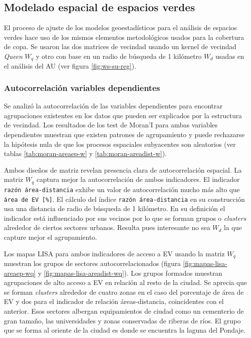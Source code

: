 \documentclass[12pt,a4paper,openany]{book}
\theoremstyle{definition}
\theoremstyle{definition}
\theoremstyle{definition}
\theoremstyle{remark}
\begin{document}
\subsection{Modelado espacial de espacios
verdes}\label{modelado-espacial-de-espacios-verdes}

El proceso de ajuste de los modelos geoestadísticos para el análisis de
espacios verdes hace uso de los mismos elementos metodológicos usados
para la cobertura de copa. Se usaron las dos matrices de vecindad usando
un kernel de vecindad \emph{Queen} \(W_q\) y otro con base en un radio
de búsqueda de 1 kilómetro \(W_d\) usadas en el análisis del AU (ver
figura \ref{fig:ws-su-reg}).

\subsubsection{Autocorrelación variables
dependientes}\label{autocorrelaciuxf3n-variables-dependientes-1}

Se analizó la autocorrelación de las variables dependientes para
encontrar agrupaciones existentes en los datos que pueden ser explicados
por la estructura de vecindad. Los resultados de los test de Moran'I
para ambas variables dependientes muestran que existen patrones de
agrupamiento y puede rechazarse la hipótesis nula de que los procesos
espaciales subyacentes son aleatorios (ver tablas
\ref{tab:moran-areaep-w} y \ref{tab:moran-areadist-w}).

Ambos diseños de matriz revelan presencia clara de autocorrelación
espacial. La matriz \(W_q\) captura mejor la autocorrelación de ambos
indicadores. El indicador \texttt{razón\ área-distancia} exhibe un valor
de autocorrelación mucho más alto que \texttt{área\ de\ EV\ {[}\%{]}}.
El cálculo del índice \texttt{razón\ área-distancia} en su construcción
usa una distancia de radio de búsqueda de 1 kilómetro. En su definición
el indicador está influenciado por sus vecinos por lo que se forman
grupos o \emph{clusters} alrededor de ciertos sectores urbanos. Resulta
pues interesante no sea \(W_d\) la que capture mejor el agrupamiento.

Los mapas LISA para ambos indicadores de acceso a EV usando la matriz
\(W_q\) muestran los grupos de sectores autocorrelacionados (figura
\ref{fig:mapas-lisa-areaep-wq} y \ref{fig:mapas-lisa-areadist-wq}). Los
grupos formados muestran agrupaciones de alto acceso a EV en relación al
resto de la ciudad. Se aprecia que se forman \emph{clusters} alrededor
de cuatro zonas en el caso del porcentaje de área de EV y dos para el
indicador de relación áreas-distancia, coincidentes con el anterior.
Esos sectores albergan equipamientos de ciudad como un cementerio de
gran tamaño, las universidades y zonas conservadas de riberas de ríos.
El grupo que se forma al oriente de la ciudad es donde se encuentra la
laguna del Pondaje.
\end{document}
